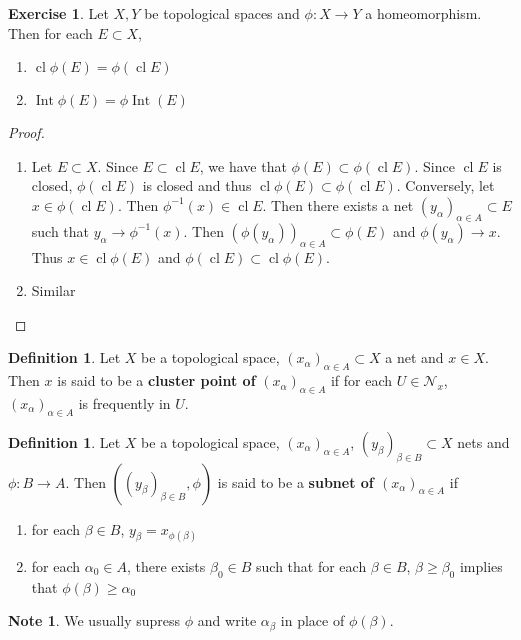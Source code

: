 \documentclass[12pt]{amsart}
\theoremstyle{definition}
\newtheorem{defn}[definition]{Definition}
\newtheorem{note}[definition]{Note}
\newtheorem{ex}[definition]{Exercise}
\newcommand{\al}{\alpha}
\newcommand{\be}{\beta}
\newcommand{\MN}{\mathcal{N}}
\newcommand{\tbf}[1]{\textbf{#1}}
\DeclareMathOperator{\cl}{cl}
\DeclareMathOperator{\Int}{Int}
\DeclareMathOperator*{\0}{\mbf{0}}
\DeclareMathOperator*{\1}{\mbf{1}}
\newcommand{\lex}[1]{\label{ex:#1}}
\newcommand{\ld}[1]{\label{defn:#1}}
\begin{document}
	\begin{ex} \lex{33013}
		Let $X, Y$ be topological spaces and $\phi: X \rightarrow Y$ a homeomorphism. Then for each $E \subset X$, 
		\begin{enumerate}
			\item $\cl \phi(E) = \phi(\cl E)$  \item $\Int \phi(E) = \phi\Int (E)$  
		\end{enumerate} 
	\end{ex}
	
	\begin{proof}\
		\begin{enumerate}
			\item Let $E \subset X$. Since $E \subset \cl E$, we have that $\phi(E) \subset \phi(\cl E)$. Since $\cl E$ is closed, $\phi(\cl E)$ is closed and thus $\cl \phi(E) \subset \phi(\cl E)$. Conversely, let $x \in \phi(\cl E)$. Then $\phi^{-1}(x) \in \cl E$. Then there exists a net $( y_{\al} )_{\al \in A} \subset E$ such that $y_{\al} \rightarrow \phi^{-1}(x)$. Then $( \phi(y_{\al}) )_{\al \in A } \subset \phi(E)$ and $\phi(y_{\al}) \rightarrow x$. Thus $x \in \cl \phi(E)$ and $\phi(\cl E) \subset \cl \phi(E)$.
			\item Similar
		\end{enumerate} 
	\end{proof}

	\begin{defn}
		Let $X$ be a topological space, $(x_{\al})_{\al \in A} \subset X$ a net and $x \in X$. Then $x$ is said to be a \tbf{cluster point of} $(x_{\al})_{\al \in A}$ if for each $U \in \MN_x$, $(x_{\al})_{\al \in A}$ is frequently in $U$.
	\end{defn}
	
	\begin{defn} \ld{33014}
	Let $X$ be a topological space, $(x_{\al})_{\al \in A}$, $(y_{\be})_{\be \in B} \subset X$ nets and $\phi:B \rightarrow A$. 
	Then $((y_{\be})_{\be \in B}, \phi)$ is said to be a \tbf{subnet of $(x_{\al})_{\al \in A}$} if 
	\begin{enumerate}
		\item for each $\beta \in B$, $y_{\beta} = x_{\phi(\beta)}$
		\item for each $\al_0 \in A$, there exists $\be_0 \in B$ such that for each $\be \in B$, $\be \geq \be_0$ implies that $\phi(\be) \geq \al_0$
	\end{enumerate}
	\end{defn}
	
	\begin{note}
		We usually supress $\phi$ and write $\al_{\be}$ in place of ${\phi(\beta)}$.
	\end{note}
	
\end{document}
